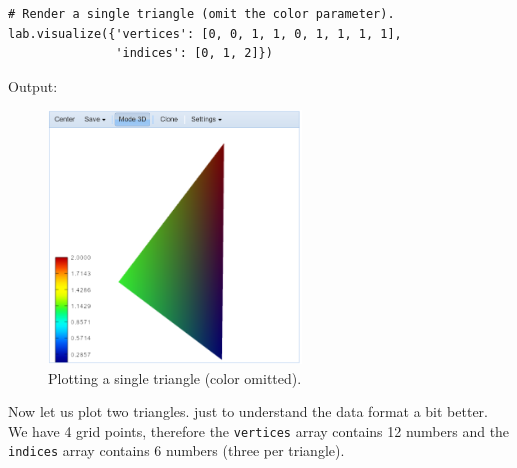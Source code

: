 \documentclass[article,A4,12pt]{llncs}
\begin{document}
\begin{verbatim}
# Render a single triangle (omit the color parameter).
lab.visualize({'vertices': [0, 0, 1, 1, 0, 1, 1, 1, 1], 
               'indices': [0, 1, 2]})
\end{verbatim}
Output:

\begin{figure}[!ht]
\begin{center}
\includegraphics[width=0.6\textwidth]{img/tria2.png}
\end{center}
\vspace{-2mm}
\caption{Plotting a single triangle (color omitted).}
\label{fig:tria2}
\end{figure}
\noindent
Now let us plot two triangles. just to understand the data format a bit better.
We have 4 grid points, therefore the {\tt vertices} array contains 12 numbers
and the {\tt indices} array contains 6 numbers (three per triangle).
\end{document}

